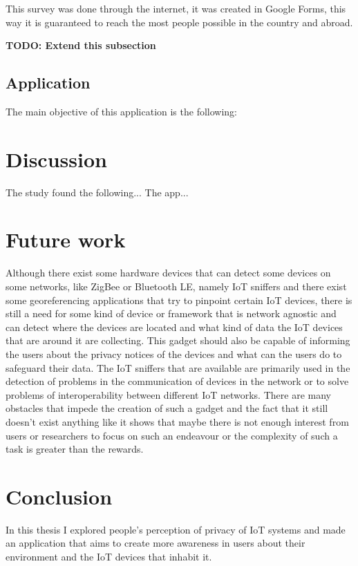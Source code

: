\documentclass[conference]{IEEEtran}
\begin{document}
This survey was done through the internet, it was created in Google Forms,
this way it is guaranteed to reach the most people possible in the country and
abroad.

\textbf{TODO: Extend this subsection}

\subsection{Application}

The main objective of this application is the following:

\section{Discussion}

The study found the following... The app...

\section{Future work}

Although there exist some hardware devices that can detect some devices
on some networks, like ZigBee or Bluetooth LE, namely IoT sniffers and
there exist some georeferencing applications that try to pinpoint certain
IoT devices, there is still a need for some kind of device or framework
that is network agnostic and can detect where the devices are located and
what kind of data the IoT devices that are around it are collecting.
This gadget should also be capable of informing the users about the privacy
notices of the devices and what can the users do to safeguard their data.
The IoT sniffers that are available are primarily used in the detection of
problems in the communication of devices in the network or to solve problems
of interoperability between different IoT networks. There are many obstacles
that impede the creation of such a gadget and the fact that it still doesn't
exist anything like it shows that maybe there is not enough interest from
users or researchers to focus on such an endeavour or the complexity
of such a task is greater than the rewards.

\section{Conclusion}

In this thesis I explored people's perception of privacy of IoT systems and
made an application that aims to create more awareness in users about their
environment and the IoT devices that inhabit it.
\end{document}
